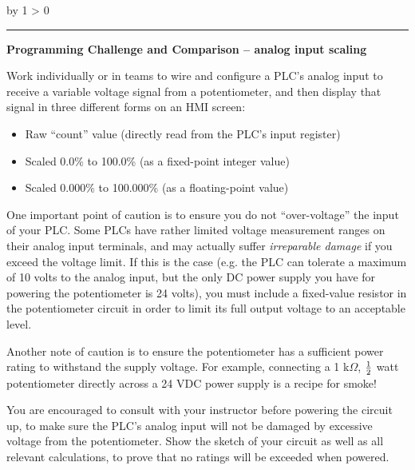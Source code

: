 \documentclass[12pt,a4paper]{article}
\def\oppgave{
            \advance\questnum by 1
            \ifnum \questnum > 0
                 \hrule
                 \vskip 3pt
                 \leftline{Oppgave \the\questnum}
                 \vskip 3pt \fi}
\begin{document}
\vfil \eject 



\oppgave{} 

\noindent
{\bf Programming Challenge and Comparison -- analog input scaling} 

\vskip 10pt

Work individually or in teams to wire and configure a PLC's analog input to receive a variable voltage signal from a potentiometer, and then display that signal in three different forms on an HMI screen:

\begin{itemize}
\item{} Raw ``count'' value (directly read from the PLC's input register)
\item{} Scaled 0.0\% to 100.0\% (as a fixed-point integer value)
\item{} Scaled 0.000\% to 100.000\% (as a floating-point value)
\end{itemize}

\vskip 10pt

One important point of caution is to ensure you do not ``over-voltage'' the input of your PLC.  Some PLCs have rather limited voltage measurement ranges on their analog input terminals, and may actually suffer {\it irreparable damage} if you exceed the voltage limit.  If this is the case (e.g. the PLC can tolerate a maximum of 10 volts to the analog input, but the only DC power supply you have for powering the potentiometer is 24 volts), you must include a fixed-value resistor in the potentiometer circuit in order to limit its full output voltage to an acceptable level.

Another note of caution is to ensure the potentiometer has a sufficient power rating to withstand the supply voltage.  For example, connecting a 1 k$\Omega$, ${1 \over 2}$ watt potentiometer directly across a 24 VDC power supply is a recipe for smoke!

\vskip 10pt

You are encouraged to consult with your instructor before powering the circuit up, to make sure the PLC's analog input will not be damaged by excessive voltage from the potentiometer.  Show the sketch of your circuit as well as all relevant calculations, to prove that no ratings will be exceeded when powered.
\end{document}
